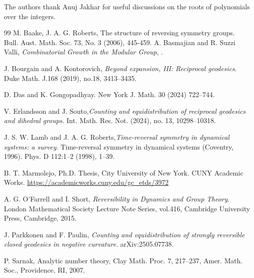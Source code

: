 \documentclass[11pt]{amsart}
\numberwithin{equation}{section}
\theoremstyle{definition}
\numberwithin{equation}{section}
\begin{document}
		The authors thank Anuj Jakhar for useful discussions on the roots of polynomials over the integers. 
		
		\begin{thebibliography}{99}
			 M. Baake, J. A. G. Roberts,
			\newblock The structure of reversing symmetry groups. 
			\newblock Bull. Aust. Math. Soc.  73, No. 3 (2006),  445-459. 
			A. Basmajian and R. Suzzi Valli, \emph{Combinatorial Growth in the Modular Group},
			. 
			
			 J. Bourgain and A.  Kontorovich, 
			\emph{Beyond expansion, III: Reciprocal geodesics}.
			Duke Math. J.168 (2019), no.18, 3413–3435.
			
			 D. Das and  K. Gongopadhyay.
			\newblock     New York J. Math. 30 (2024) 722–744.
			
			 V. Erlandsson and J. Souto,{\em Counting and equidistribution of reciprocal geodesics and dihedral groups.} \newblock Int. Math. Res. Not.  (2024),  no. 13, 10298–10318.
			
			J. S. W. Lamb and J. A. G. Roberts,{\em Time-reversal symmetry in dynamical systems: a survey}. Time-reversal symmetry in dynamical systems (Coventry, 1996). Phys. D 112:1–2 (1998), 1–39. 
			
			
			 B. T. Marmolejo, 
			 Ph.D. Thesis, City University of New York. 
			\newblock CUNY Academic Works.
			\newblock \url{https://academicworks.cuny.edu/gc_etds/3972}
			
			
			
			 A.  G. O’Farrell and I.  Short, {\it Reversibility in Dynamics and Group Theory}. London Mathematical Society Lecture Note Series, vol.416, Cambridge University Press, Cambridge, 2015.

            J. Parkkonen and F. Paulin, {\em Counting and equidistribution of strongly reversible closed geodesics in negative curvature}. arXiv:2505.07738. 
			
			 P. Sarnak, 
			\newblock Analytic number theory,  
			Clay Math. Proc. 7,  217–237, Amer. Math. Soc., Providence, RI, 2007. 
			
			
			
			
			
			
			
		\end{thebibliography}
	
\end{document}
